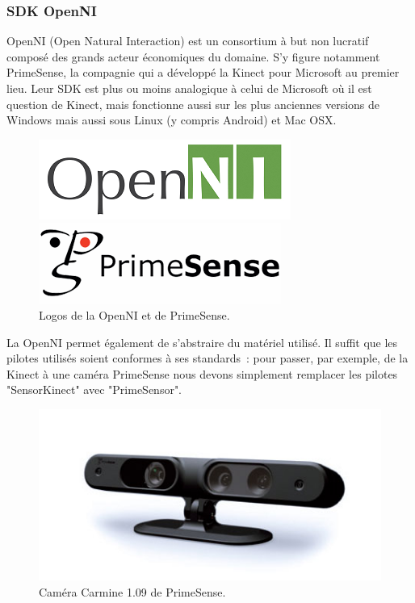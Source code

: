 \subsubsection{SDK OpenNI}
OpenNI (Open Natural Interaction) est un consortium à but non lucratif composé
des grands acteur économiques du domaine. S'y figure notamment PrimeSense, la 
compagnie qui a développé la Kinect pour Microsoft au premier lieu. Leur SDK
est plus ou moins analogique à celui de Microsoft où il est question de
Kinect, mais fonctionne aussi sur les plus anciennes 
versions de Windows mais
aussi sous Linux (y compris Android) et Mac OSX.
\begin{figure}[h!]
\begin{minipage}{0.49\linewidth}
  \centering
  \includegraphics[width=0.9\linewidth]{images/openni_logo}
\end{minipage}
\begin{minipage}{0.49\linewidth}
  \centering
  \includegraphics[width=0.9\linewidth]{images/primesense_logo}
\end{minipage}

\caption{Logos de la OpenNI et de PrimeSense.}
\end{figure}
La OpenNI permet également de s'abstraire du matériel utilisé. Il suffit que
les pilotes utilisés soient conformes à ses standards~: pour passer, par 
exemple, de la Kinect à une caméra PrimeSense nous devons simplement remplacer 
les pilotes "SensorKinect" avec "PrimeSensor".
\begin{figure}[h!]
\centering
\includegraphics[width=0.6\linewidth]{images/primesense_camera}
\caption{Caméra Carmine 1.09 de PrimeSense.}
\end{figure}

